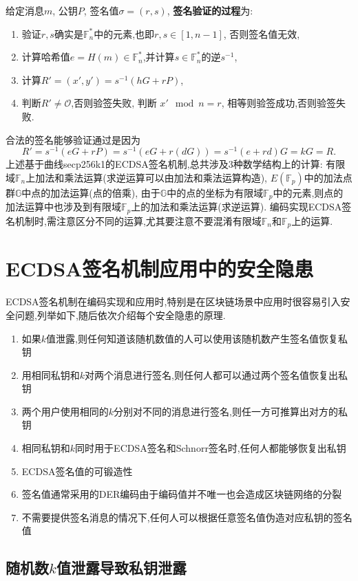 \documentclass{article}
\renewcommand{\G}{\mathbb{G}}
\newcommand{\F}{\mathbb{F}}
\begin{document}
给定消息$m$, 公钥$P$, 签名值$\sigma = (r, s)$, \textbf{签名验证的过程}为:
\begin{enumerate}
\item  验证$r, s$确实是$\F_n^*$中的元素,也即$r, s \in [1, n-1]$, 否则签名值无效,
\item 计算哈希值$e=H(m)\in\F_n^*$,并计算$s\in\F_n^*$的逆$s^{-1}$,
\item  计算$R' = (x', y') = s^{-1}(hG + rP)$, 
\item 判断$R' \neq \mathcal{O}$,否则验签失败, 判断 $x' \mod n = r$, 相等则验签成功,否则验签失败.
\end{enumerate}
合法的签名能够验证通过是因为
$$R' = s^{-1}(eG + rP) = s^{-1}(eG + r(dG)) = s^{-1}(e+rd)G = kG = R.$$
上述基于曲线secp256k1的ECDSA签名机制,总共涉及3种数学结构上的计算:
有限域$\F_n$上加法和乘法运算(求逆运算可以由加法和乘法运算构造), $E(\F_p)$中的加法点群$\G$中点的加法运算(点的倍乘),
由于$\G$中的点的坐标为有限域$\F_p$中的元素,则点的加法运算中也涉及到有限域$\F_p$上的加法和乘法运算(求逆运算).
编码实现ECDSA签名机制时,需注意区分不同的运算,尤其要注意不要混淆有限域$\F_n$和$\F_p$上的运算.

\section{ECDSA签名机制应用中的安全隐患}

ECDSA签名机制在编码实现和应用时,特别是在区块链场景中应用时很容易引入安全问题,列举如下,随后依次介绍每个安全隐患的原理.
\begin{enumerate}
\item 如果$k$值泄露,则任何知道该随机数值的人可以使用该随机数产生签名值恢复私钥
\item 用相同私钥和$k$对两个消息进行签名,则任何人都可以通过两个签名值恢复出私钥
\item 两个用户使用相同的$k$分别对不同的消息进行签名,则任一方可推算出对方的私钥
\item 相同私钥和$k$同时用于ECDSA签名和Schnorr签名时,任何人都能够恢复出私钥
\item ECDSA签名值的可锻造性
\item 签名值通常采用的DER编码由于编码值并不唯一也会造成区块链网络的分裂
\item 不需要提供签名消息的情况下,任何人可以根据任意签名值伪造对应私钥的签名值
\end{enumerate}

\subsection{随机数$k$值泄露导致私钥泄露}
\end{document}
